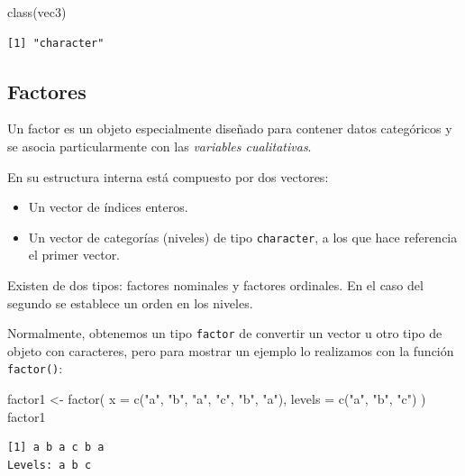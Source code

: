 \documentclass[
  spanish,
  a4paper,
]{scrbook}
\newenvironment{Shaded}{\begin{snugshade}}{\end{snugshade}}
\newcommand{\AttributeTok}[1]{\textcolor[rgb]{0.40,0.45,0.13}{#1}}
\newcommand{\FunctionTok}[1]{\textcolor[rgb]{0.28,0.35,0.67}{#1}}
\newcommand{\NormalTok}[1]{\textcolor[rgb]{0.00,0.23,0.31}{#1}}
\newcommand{\OtherTok}[1]{\textcolor[rgb]{0.00,0.23,0.31}{#1}}
\newcommand{\StringTok}[1]{\textcolor[rgb]{0.13,0.47,0.30}{#1}}
\begin{document}
\begin{Shaded}
\begin{Highlighting}[]
\FunctionTok{class}\NormalTok{(vec3)}
\end{Highlighting}
\end{Shaded}

\begin{verbatim}
[1] "character"
\end{verbatim}

\subsection{Factores}\label{factores}

Un factor es un objeto especialmente diseñado para contener datos
categóricos y se asocia particularmente con las \emph{variables
cualitativas}.

En su estructura interna está compuesto por dos vectores:

\begin{itemize}
\item
  Un vector de índices enteros.
\item
  Un vector de categorías (niveles) de tipo \texttt{character}, a los
  que hace referencia el primer vector.
\end{itemize}

Existen de dos tipos: factores nominales y factores ordinales. En el
caso del segundo se establece un orden en los niveles.

Normalmente, obtenemos un tipo \texttt{factor} de convertir un vector u
otro tipo de objeto con caracteres, pero para mostrar un ejemplo lo
realizamos con la función \texttt{factor()}:

\begin{Shaded}
\begin{Highlighting}[]
\NormalTok{factor1 }\OtherTok{\textless{}{-}} \FunctionTok{factor}\NormalTok{(}
  \AttributeTok{x =} \FunctionTok{c}\NormalTok{(}\StringTok{"a"}\NormalTok{, }\StringTok{"b"}\NormalTok{, }\StringTok{"a"}\NormalTok{, }\StringTok{"c"}\NormalTok{, }\StringTok{"b"}\NormalTok{, }\StringTok{"a"}\NormalTok{),}
  \AttributeTok{levels =} \FunctionTok{c}\NormalTok{(}\StringTok{"a"}\NormalTok{, }\StringTok{"b"}\NormalTok{, }\StringTok{"c"}\NormalTok{)}
\NormalTok{)}
\NormalTok{factor1}
\end{Highlighting}
\end{Shaded}

\begin{verbatim}
[1] a b a c b a
Levels: a b c
\end{verbatim}
\end{document}

